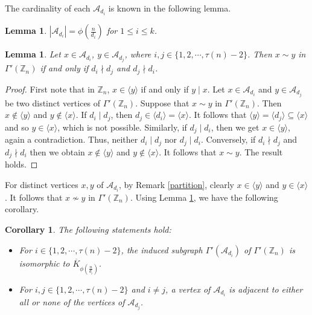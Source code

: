 \documentclass{amsart}
\theoremstyle{plain}
\newtheorem{lemma}[theorem]{Lemma}
\newtheorem{corollary}[theorem]{Corollary}
\theoremstyle{definition}
\theoremstyle{remark}
\begin{document}
The cardinality of each $\mathcal{A}_{d_i}$ is known in the following lemma.
\begin{lemma}\cite{young2015adjacency}\label{valueof partition}
$|\mathcal{A}_{d_{i}}| = \phi(\frac{n}{d_i})$ for $1 \leq i \leq k$.
\end{lemma}


\begin{lemma}\label{adjacenyofvertex}
Let $x \in \mathcal{A}_{d_{i}}$, $ y \in \mathcal{A}_{d_{j}}$, where $i, j \in \{1, 2, \cdots, \tau(n)-2\}$. Then $x \sim y$ in $\Gamma'(\mathbb{Z}_n)$ if and only if $d_i \nmid d_j$ and $d_j \nmid d_i$.
\end{lemma}
\begin{proof}
First note that in $\mathbb{Z}_n$, $x \in \langle y \rangle$ if and only if $y \mid x$. Let $x \in \mathcal{A}_{d_{i}}$ and $y \in \mathcal{A}_{d_{j}}$ be two distinct vertices of $\Gamma'(\mathbb{Z}_n)$. Suppose that $x \sim y$ in $\Gamma'(\mathbb{Z}_n)$. Then $x \notin \langle y \rangle$ and $y \notin \langle x \rangle$. If $d_i \mid d_j$, then $d_j \in \langle d_i \rangle = \langle x \rangle$. It follows that $\langle y \rangle = \langle d_j \rangle \subseteq \langle x \rangle$ and so $y \in \langle x \rangle$, which is not possible. Similarly, if $d_j \mid d_i$, then we get $x \in \langle y \rangle$, again a contradiction. Thus, neither $d_i \mid d_j$ nor $d_j \mid d_i$. Conversely, if $d_i \nmid d_j$ and $d_j \nmid d_i$ then we obtain $x \notin \langle y \rangle$ and $y \notin \langle x \rangle$. It follows that $x \sim y$. The result holds.
\end{proof}

 For distinct vertices $x, y$ of $\mathcal{A}_{d_{i}}$, by Remark \ref{partition}, clearly $x \in \langle y \rangle$ and $y \in \langle x \rangle$. It  follows that $x \nsim y$ in $\Gamma'(\mathbb{Z}_n)$. Using Lemma \ref{valueof partition}, we have the following corollary.  

\begin{corollary}\label{partitionofcozerodivisorgraphisomorphic}
The following statements hold:
\begin{itemize}
    \item[(i)] For $i \in \{1, 2, \cdots, \tau(n)-2\}$, the induced subgraph $\Gamma'(\mathcal{A}_{d_i})$ of $\Gamma'(\mathbb{Z}_n)$ is isomorphic to $\overline{K}_{\phi(\frac{n}{d_i})}$.
    \item [(ii)] For $i,j \in \{1, 2, \cdots, \tau(n)-2\}$ and $i \neq j$, a vertex of $\mathcal{A}_{d_i}$ is adjacent to either all or none of the vertices of $\mathcal{A}_{d_j}$. 
\end{itemize}
\end{corollary}
\end{document}
